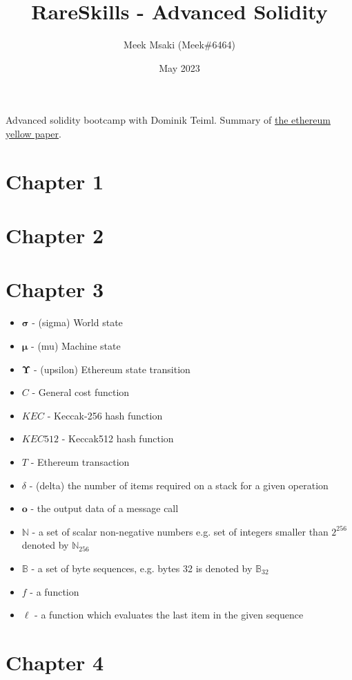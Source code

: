 \documentclass{article}
\title{RareSkills - Advanced Solidity}
\author{Meek Msaki (Meek\#6464)}
\date{May 2023}
\begin{document}
\maketitle
Advanced solidity bootcamp with Dominik Teiml. Summary of \href{https://ethereum.github.io/yellowpaper/paper.pdf}{the ethereum yellow paper}.
\section{Chapter 1}
\section{Chapter 2}
\section{Chapter 3}
\begin{itemize}
    \item $\bm{\sigma}$ - (sigma) World state
    \item $\bm{\mu}$ - (mu) Machine state
    \item $\bm{\Upsilon}$ - (upsilon) Ethereum state transition
    \item $C$ - General cost function
    \item $KEC$ - Keccak-256 hash function
    \item $KEC512$ - Keccak512 hash function
    \item $T$ - Ethereum transaction
    \item $\delta$ - (delta) the number of items required on a stack for a given operation
    \item $\textbf{o}$ - the output data of a message call
    \item $\mathbb{N}$ - a set of scalar non-negative numbers e.g. set of integers smaller than $2^{256}$ denoted by $\mathbb{N}_{256}$
    \item $\mathbb{B}$ - a set of byte sequences, e.g. bytes 32 is denoted by $\mathbb{B}_{32}$
    \item $f$ - a function
    \item $\ell$ - a function which evaluates the last item in the given sequence
\end{itemize}

\section{Chapter 4}
\end{document}

